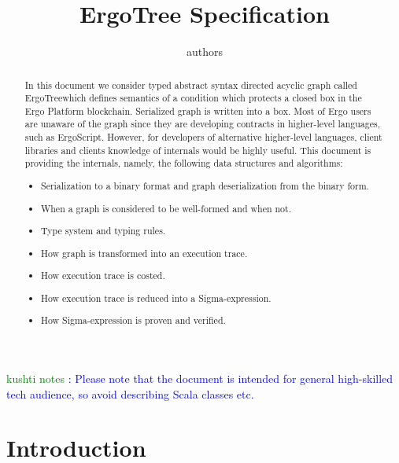\documentclass[11pt]{article}
\newcommand{\authnote}[2]{\textsf{#1 \textcolor{blue}{: #2}}}
\newcommand{\knote}[1]{{\authnote{\textcolor{green}{kushti notes}}{#1}}}
\newcommand{\asdag}{ErgoTree}
\begin{document}
\title{ErgoTree Specification}

\author{authors}


\maketitle

\begin{abstract}
In this document we consider typed abstract syntax directed acyclic graph
called \asdag which defines semantics of a condition which protects a closed
box in the Ergo Platform blockchain. Serialized graph is written into a box.
Most of Ergo users are unaware of the graph since they are developing contracts in higher-level languages, such as
ErgoScript. However, for developers of alternative higher-level languages, client libraries and clients knowledge of
internals would be highly useful. This document is providing the internals, namely, the following data structures and
algorithms:
\begin{itemize}
\item{} Serialization to a binary format and graph deserialization from the binary form.
\item{} When a graph is considered to be well-formed and when not.
\item{} Type system and typing rules.
\item{} How graph is transformed into an execution trace.
\item{} How execution trace is costed.
\item{} How execution trace is reduced into a Sigma-expression.
\item{} How Sigma-expression is proven and verified.
\end{itemize}
\end{abstract}

\knote{Please note that the document is intended for general high-skilled tech audience, so avoid describing Scala
classes etc.}

\tableofcontents

\section{Introduction}
\label{sec:intro}

















\appendix




\end{document}
